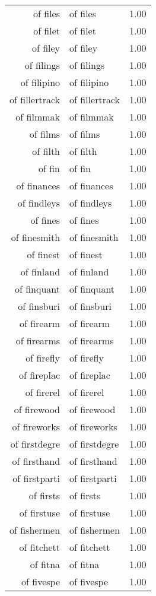 \begin{table}[ht]
\begin{tabular}{rlr}
  of files & of files & 1.00 \\ 
  of filet & of filet & 1.00 \\ 
  of filey & of filey & 1.00 \\ 
  of filings & of filings & 1.00 \\ 
  of filipino & of filipino & 1.00 \\ 
  of fillertrack & of fillertrack & 1.00 \\ 
  of filmmak & of filmmak & 1.00 \\ 
  of films & of films & 1.00 \\ 
  of filth & of filth & 1.00 \\ 
  of fin & of fin & 1.00 \\ 
  of finances & of finances & 1.00 \\ 
  of findleys & of findleys & 1.00 \\ 
  of fines & of fines & 1.00 \\ 
  of finesmith & of finesmith & 1.00 \\ 
  of finest & of finest & 1.00 \\ 
  of finland & of finland & 1.00 \\ 
  of finquant & of finquant & 1.00 \\ 
  of finsburi & of finsburi & 1.00 \\ 
  of firearm & of firearm & 1.00 \\ 
  of firearms & of firearms & 1.00 \\ 
  of firefly & of firefly & 1.00 \\ 
  of fireplac & of fireplac & 1.00 \\ 
  of firerel & of firerel & 1.00 \\ 
  of firewood & of firewood & 1.00 \\ 
  of fireworks & of fireworks & 1.00 \\ 
  of firstdegre & of firstdegre & 1.00 \\ 
  of firsthand & of firsthand & 1.00 \\ 
  of firstparti & of firstparti & 1.00 \\ 
  of firsts & of firsts & 1.00 \\ 
  of firstuse & of firstuse & 1.00 \\ 
  of fishermen & of fishermen & 1.00 \\ 
  of fitchett & of fitchett & 1.00 \\ 
  of fitna & of fitna & 1.00 \\ 
  of fivespe & of fivespe & 1.00 \\ 

\end{tabular}
\end{table}
